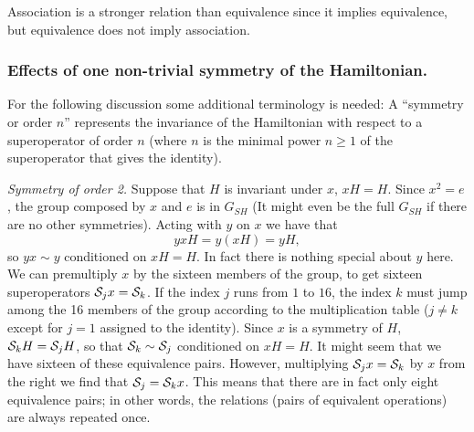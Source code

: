 {Association is a stronger relation than equivalence since it  implies equivalence,
but equivalence does not imply association.




\subsubsection{Effects of one non-trivial symmetry of the Hamiltonian.}
%
For the following discussion some additional terminology is needed: A ``symmetry or order $n$'' represents the invariance of the Hamiltonian with respect to a superoperator of order $n$ (where $n$ is the minimal power $n\ge 1$ of the superoperator that gives  the identity).


{\it Symmetry of order 2.} Suppose that $H$ is invariant under $x$,  $xH=H$. Since $x^{2}=e$, the group composed by $x$ and $e$ is  in $G_{SH}$ (It might even be the full $G_{SH}$ if there are no other symmetries). Acting with $y$ on $x$ we have that
%
\begin{equation}
yx H=y(xH)=yH,
\end{equation}
%
so $yx\sim y$ conditioned on $xH=H$.
In fact there is nothing special about $y$ here. We can premultiply $x$ by the sixteen members of the group, to get
sixteen superoperators
${\cal S}_j x= {\cal S}_k$. If the index $j$ runs from $1$ to $16$, the index $k$ must jump among  the 16 members of the group
according to the multiplication table ($j\ne k$ except for $j=1$ assigned to the identity). Since $x$ is a symmetry of $H$,  ${\cal S}_k H={\cal S}_j H$, so that ${\cal S}_k\sim {\cal S}_j$ conditioned on $xH=H$.   It might seem that we have sixteen of these
equivalence pairs. However, multiplying ${\cal S}_j x= {\cal S}_k$ by $x$ from the right we find that ${\cal S}_j={\cal S}_k x$. This means that there are in fact only eight equivalence pairs; in other words, the relations (pairs of equivalent operations) are always repeated once.



}

